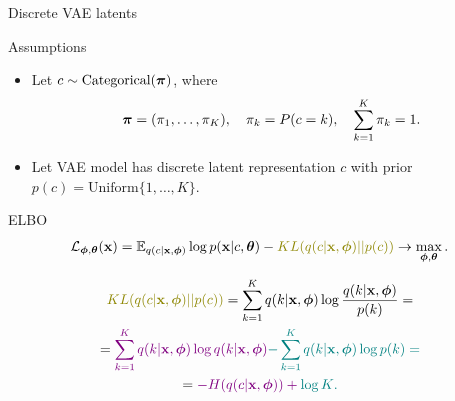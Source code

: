 \begin{frame}{Discrete VAE latents}
	\begin{block}{Assumptions}
		\begin{itemize}
			\item Let $c \sim \text{Categorical}(\boldsymbol{\pi})$, where 
			\vspace{-0.6cm}
			\[
			\boldsymbol{\pi} = (\pi_1, \dots, \pi_K), \quad \pi_k = P(c = k), \quad \sum_{k=1}^K \pi_k = 1.
			\]
			\vspace{-0.6cm}
			\item Let VAE model has discrete latent representation $c$ with prior $p(c) = \text{Uniform}\{1, \dots, K\}$.
		\end{itemize}
	\end{block}
	\begin{block}{ELBO}
		\vspace{-0.5cm}
		\[
			\cL_{\bphi, \btheta}(\bx)  = \mathbb{E}_{q(c | \bx, \bphi)} \log p(\bx | c, \btheta) - {\color{olive} KL(q(c| \bx, \bphi) || p(c))} \rightarrow \max_{\bphi, \btheta}.
		\]
	\end{block}
	\vspace{-1.0cm}
	{\small
	\begin{multline*}
		{\color{olive} KL(q(c| \bx, \bphi) || p(c))} = \sum_{k=1}^K q(k | \bx, \bphi) \log \frac{q(k | \bx, \bphi)}{p(k)} = 
		\\ = \color{violet}{\sum_{k=1}^K q(k | \bx, \bphi) \log q(k | \bx, \bphi)}  \color{teal}{- \sum_{k=1}^K q(k | \bx, \bphi) \log p(k)}  = \\ = \color{violet}{- H(q(c | \bx, \bphi))} + \color{teal}{\log K}. 
	\end{multline*}
	}
\end{frame}
